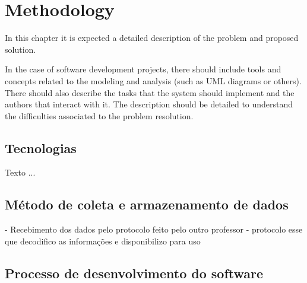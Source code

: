 



\chapter{Methodology}\label{cap:metodology}

In this chapter it is expected a detailed description of the problem and proposed solution.

In the case of software development projects, there should include tools and concepts related to the modeling and analysis (such as UML diagrams or others). There should also describe the tasks that the system should implement and the authors that interact with it. The description should be detailed to understand the difficulties associated to the problem resolution.

\section[Tecnologias]{Tecnologias}
Texto ...

\section[Método de coleta e armazenamento de dados]{Método de coleta e armazenamento de dados}
- Recebimento dos dados pelo protocolo feito pelo outro professor
- protocolo esse que decodifico as informações e disponibilizo para uso

\section[Processo de desenvolvimento do software]{Processo de desenvolvimento do software}


